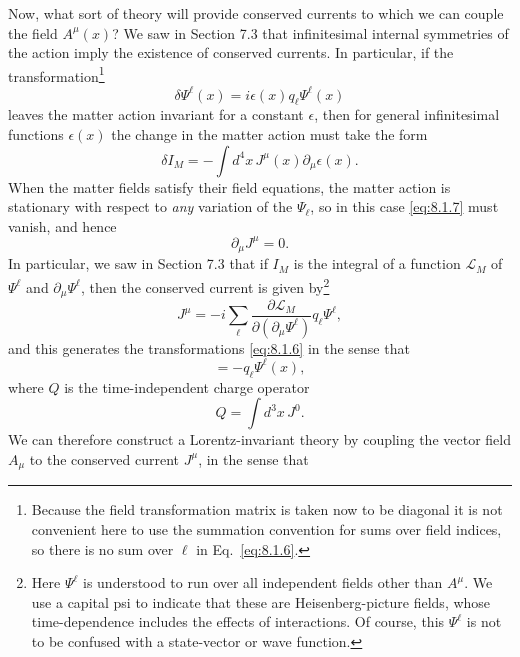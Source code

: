 Now, what sort of theory will provide conserved currents to which we
can couple the field $A^\mu(x)$? We saw in Section 7.3 that infinitesimal internal
symmetries of the action imply the existence of conserved currents. In
particular, if the transformation\footnote{Because the field transformation
matrix is taken now to be diagonal it is not convenient here to use the
summation convention for sums over field indices, so there is no sum over
$\ell$ in Eq.~\eqref{eq:8.1.6}.}
\begin{equation}
  \delta\Psi^\ell(x)=i\epsilon(x)q_\ell\Psi^\ell(x)
  \tag{8.1.6}\label{eq:8.1.6}
\end{equation}
leaves the matter action invariant for a constant $\epsilon$, then for general
infinitesimal functions $\epsilon(x)$ the change in the matter action must take the
form
\begin{equation}
  \delta I_M=-\int d^4x\,J^\mu(x)\partial_\mu\epsilon(x).
  \tag{8.1.7}\label{eq:8.1.7}
\end{equation}
When the matter fields satisfy their field equations, the matter action is
stationary with respect to \textit{any} variation of the $\Psi_\ell$, so in this case \eqref{eq:8.1.7}
must vanish, and hence
\begin{equation}
  \partial_\mu J^\mu=0.
  \tag{8.1.8}\label{eq:8.1.8}
\end{equation}
In particular, we saw in Section 7.3 that if $I_M$ is the integral of a function
$\mathcal L_M$ of $\Psi^\ell$ and $\partial_\mu\Psi^\ell$, then the conserved current is given by\footnote{Here
$\Psi^\ell$ is understood to run over all independent fields other than
$A^\mu$. We use a capital psi to indicate that these are Heisenberg-picture
fields, whose time-dependence includes the effects of interactions. Of course,
this $\Psi^\ell$ is not to be confused with a state-vector or wave function.}
\[
  J^\mu=-i\sum_\ell
  \frac{\partial\mathcal L_M}{\partial(\partial_\mu\Psi^\ell)}
  q_\ell\Psi^\ell,
\]
and this generates the transformations \eqref{eq:8.1.6} in the sense that
\begin{equation}
  [Q,\Psi^\ell(x)]=-q_\ell\Psi^\ell(x),
  \tag{8.1.9}\label{eq:8.1.9}
\end{equation}
where $Q$ is the time-independent charge operator
\begin{equation}
  Q=\int d^3x\,J^0.
  \tag{8.1.10}\label{eq:8.1.10}
\end{equation}
We can therefore construct a Lorentz-invariant theory by coupling the
vector field $A_\mu$ to the conserved current $J^\mu$, in the sense that
